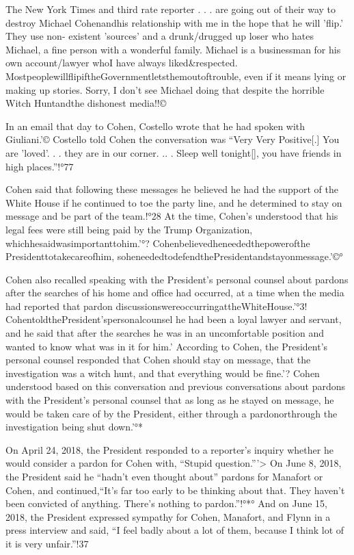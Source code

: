 The New York Times and third rate reporter . . . are going out of their way to destroy Michael Cohenandhis relationship with me in the hope that he will 'flip.'
They use non- existent 'sources' and a drunk/drugged up loser who hates Michael, a fine person with a wonderful family.
Michael is a businessman for his own account/lawyer whoI have always liked&respected.
MostpeoplewillflipiftheGovernmentletsthemoutoftrouble, even if it means lying or making up stories.
Sorry, I don't see Michael doing that despite the horrible Witch Huntandthe dishonest media!!©%

In an email that day to Cohen, Costello wrote that he had spoken with Giuliani.'© Costello told Cohen the conversation was “Very Very Positive[.] You are 'loved'. . . they are in our corner. .. . Sleep well tonight[], you have friends in high places.”!°77

Cohen said that following these messages he believed he had the support of the White House if he continued to toe the party line, and he determined to stay on message and be part of the team.!°28
At the time, Cohen's understood that his legal fees were still being paid by the Trump Organization, whichhesaidwasimportanttohim.'°?
Cohenbelievedheneededthepowerofthe Presidenttotakecareofhim, soheneededtodefendthePresidentandstayonmessage.'©°

Cohen also recalled speaking with the President's personal counsel about pardons after the searches of his home and office had occurred, at a time when the media had reported that pardon discussionswereoccurringattheWhiteHouse.'°3!
CohentoldthePresident'spersonalcounsel he had been a loyal lawyer and servant, and he said that after the searches he was in an uncomfortable position and wanted to know what was in it for him.'%
According to Cohen, the President's personal counsel responded that Cohen should stay on message, that the investigation was a witch hunt, and that everything would be fine.'?
Cohen understood based on this conversation and previous conversations about pardons with the President's personal counsel that as long as he stayed on message, he would be taken care of by the President, either through a pardonorthrough the investigation being shut down.'°*

On April 24, 2018, the President responded to a reporter's inquiry whether he would consider a pardon for Cohen with, “Stupid question.”'>
On June 8, 2018, the President said he “hadn't even thought about” pardons for Manafort or Cohen, and continued,“It's far too early to be thinking about that.
They haven't been convicted of anything.
There's nothing to pardon.”!°*°
And on June 15, 2018, the President expressed sympathy for Cohen, Manafort, and Flynn in a press interview and said, “I feel badly about a lot of them, because I think lot of it is very unfair.”!37

